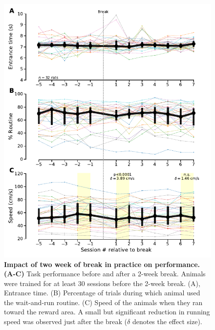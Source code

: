 \begin{figure}[!h]
  \begin{center}
    \includegraphics[scale=1]{ch-appendicies/figures/BreakEffect.pdf}
    \caption[Impact of a Two-week Break]
    {\textbf{Impact of two week of break in practice on performance.}
    \textbf{(A-C)} Task performance before and after a 2-week break. Animals were trained for at least 30 sessions before the 2-week break. (A), Entrance time. (B) Percentage of trials during which animal used the wait-and-run routine. (C) Speed of the animals when they ran toward the reward area. A small but significant reduction in running speed was observed just after the break ($\delta$ denotes the effect size).
    }
    \label{fig:appendix:break}
  \end{center}
\end{figure}